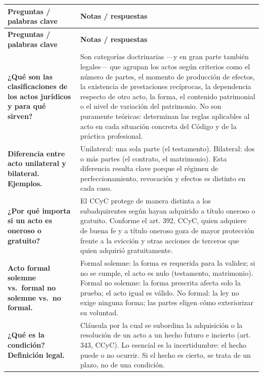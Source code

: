 \documentclass[12pt,oneside]{book}
\begin{document}
\begin{longtable}{
    >{\raggedright\arraybackslash}p{}
    >{\raggedright\arraybackslash}p{}
}
\toprule
\textbf{Preguntas / palabras clave} & \textbf{Notas / respuestas} \\
\midrule
\endfirsthead
\toprule
\textbf{Preguntas / palabras clave} & \textbf{Notas / respuestas} \\
\midrule
\endhead

\textbf{¿Qué son las clasificaciones de los actos jurídicos y para qué sirven?} &
Son categorías doctrinarias ---y en gran parte también legales--- que agrupan los actos según criterios como el número de partes, el momento de producción de efectos, la existencia de prestaciones recíprocas, la dependencia respecto de otro acto, la forma, el contenido patrimonial o el nivel de variación del patrimonio. No son puramente teóricas: determinan las reglas aplicables al acto en cada situación concreta del Código y de la práctica profesional. \\

\textbf{Diferencia entre acto unilateral y bilateral. Ejemplos.} &
Unilateral: una sola parte (el testamento). Bilateral: dos o más partes (el contrato, el matrimonio). Esta diferencia resulta clave porque el régimen de perfeccionamiento, revocación y efectos es distinto en cada caso. \\

\textbf{¿Por qué importa si un acto es oneroso o gratuito?} &
El CCyC protege de manera distinta a los subadquirentes según hayan adquirido a título oneroso o gratuito. Conforme el art. 392, CCyC, quien adquiere de buena fe y a título oneroso goza de mayor protección frente a la evicción y otras acciones de terceros que quien adquirió gratuitamente. \\

\textbf{Acto formal solemne vs.\ formal no solemne vs.\ no formal.} &
Formal solemne: la forma es requerida para la validez; si no se cumple, el acto es nulo (testamento, matrimonio). Formal no solemne: la forma prescrita afecta solo la prueba; el acto igual es válido. No formal: la ley no exige ninguna forma; las partes eligen cómo exteriorizar su voluntad. \\

\textbf{¿Qué es la condición? Definición legal.} &
Cláusula por la cual se subordina la adquisición o la resolución de un acto a un hecho futuro e incierto (art. 343, CCyC). Lo esencial es la incertidumbre: el hecho puede o no ocurrir. Si el hecho es cierto, se trata de un plazo, no de una condición. \\


\end{longtable}
\end{document}
